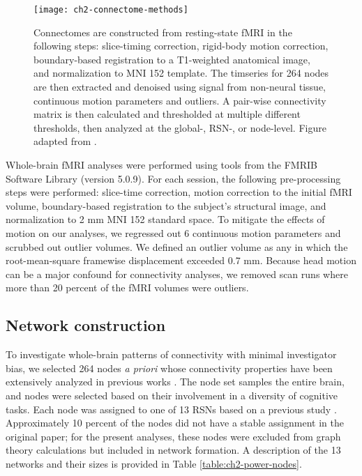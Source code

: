 \begin{figure}[t]
    \centering
    \texttt{[image: ch2-connectome-methods]}
    \caption[Schematic for connectome construction]{Connectomes are constructed from resting-state fMRI in the following steps: slice-timing correction, rigid-body motion correction, boundary-based registration to a T1-weighted anatomical image, and normalization to MNI 152 template. The timseries for 264 nodes are then extracted and denoised using signal from non-neural tissue, continuous motion parameters and outliers. A pair-wise connectivity matrix is then calculated and thresholded at multiple different thresholds, then analyzed at the global-, RSN-, or node-level. Figure adapted from \citep{Yang2018}.}
    \label{fig:ch2-connectome-methods}
\end{figure}

Whole-brain fMRI analyses were performed using tools from the FMRIB Software Library (version 5.0.9). For each session, the following pre-processing steps were performed:  slice-time correction, motion correction to the initial fMRI volume, boundary-based registration to the subject's structural image, and normalization to 2 mm MNI 152 standard space. To mitigate the effects of motion on our analyses, we regressed out 6 continuous motion parameters and scrubbed out outlier volumes. We defined an outlier volume as any in which the root-mean-square framewise displacement exceeded 0.7 mm. Because head motion can be a major confound for connectivity analyses, we removed scan runs where more than 20 percent of the fMRI volumes were outliers.

\subsection{Network construction}

To investigate whole-brain patterns of connectivity with minimal investigator bias, we selected 264 nodes \textit{a priori} whose connectivity properties have been extensively analyzed in previous works \citep{Power2011, Power2013, Cole2014}. The node set samples the entire brain, and nodes were selected based on their involvement in a diversity of cognitive tasks. Each node was assigned to one of 13 RSNs based on a previous study \citep{Power2013}. Approximately 10 percent of the nodes did not have a stable assignment in the original paper; for the present analyses, these nodes were excluded from graph theory calculations but included in network formation. A description of the 13 networks and their sizes is provided in Table \ref{table:ch2-power-nodes}. 

